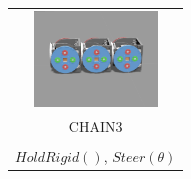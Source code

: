 \documentclass{standalone}
\newcommand{\picHeight}{1in}
\begin{document}
        \begin{tabular}{| c |}
            \hline
            \includegraphics[height=\picHeight]{body3.png} %
             \\ 
            CHAIN3
            \\ \hline
            \pbox{20cm}{\(Drive(v,t)\), \(SteeringPose()\), \(LegStep()\), \\ \(HoldRigid()\), \(Steer(\theta)\) }
            \\ \hline
        \end{tabular}
\end{document}
